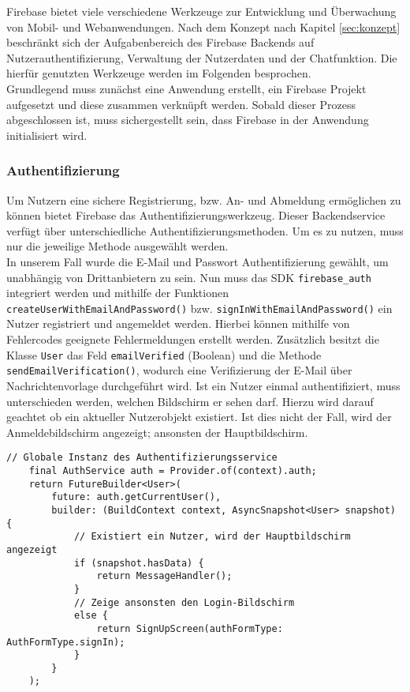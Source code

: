 Firebase bietet viele verschiedene Werkzeuge zur Entwicklung und Überwachung von Mobil- und Webanwendungen.
Nach dem Konzept nach Kapitel \ref{sec:konzept} beschränkt sich der Aufgabenbereich des Firebase Backends auf Nutzerauthentifizierung, Verwaltung der Nutzerdaten und der Chatfunktion.
Die hierfür genutzten Werkzeuge werden im Folgenden besprochen.\\
Grundlegend muss zunächst eine Anwendung erstellt, ein Firebase Projekt aufgesetzt und diese zusammen verknüpft werden.
Sobald dieser Prozess abgeschlossen ist, muss sichergestellt sein, dass Firebase in der Anwendung initialisiert wird.

\subsubsection{Authentifizierung}
Um Nutzern eine sichere Registrierung, bzw. An- und Abmeldung ermöglichen zu können bietet Firebase das Authentifizierungswerkzeug. 
Dieser Backendservice verfügt über unterschiedliche Authentifizierungsmethoden.
Um es zu nutzen, muss nur die jeweilige Methode ausgewählt werden. \\

In unserem Fall wurde die E-Mail und Passwort Authentifizierung gewählt, um unabhängig von Drittanbietern zu sein.
Nun muss das SDK \texttt{firebase\_auth} integriert werden und mithilfe der Funktionen \texttt{createUserWithEmailAndPassword()} bzw. \texttt{signInWithEmailAndPassword()} ein Nutzer registriert und angemeldet werden.
Hierbei können mithilfe von Fehlercodes geeignete Fehlermeldungen erstellt werden. 
Zusätzlich besitzt die Klasse \texttt{User} das Feld \texttt{emailVerified} (Boolean) und die Methode \texttt{sendEmailVerification()}, wodurch eine Verifizierung der E-Mail über Nachrichtenvorlage durchgeführt wird.
Ist ein Nutzer einmal authentifiziert, muss unterschieden werden, welchen Bildschirm er sehen darf.
Hierzu wird darauf geachtet ob ein aktueller Nutzerobjekt existiert.
Ist dies nicht der Fall, wird der Anmeldebildschirm angezeigt; ansonsten der Hauptbildschirm.
\medspace
\begin{lstlisting}[caption= Anzeige abhängig ob ein aktueller Nutzer existiert]
	// Globale Instanz des Authentifizierungsservice
	final AuthService auth = Provider.of(context).auth;
	return FutureBuilder<User>(
		future: auth.getCurrentUser(),
		builder: (BuildContext context, AsyncSnapshot<User> snapshot) {
			// Existiert ein Nutzer, wird der Hauptbildschirm angezeigt
			if (snapshot.hasData) {
				return MessageHandler();
			} 
			// Zeige ansonsten den Login-Bildschirm
			else {
				return SignUpScreen(authFormType: AuthFormType.signIn);
			}
		}
	);
\end{lstlisting}
\medspace

